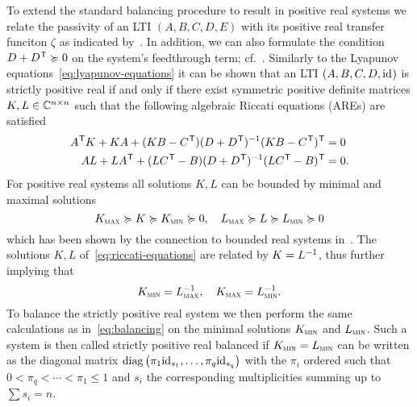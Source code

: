 To extend the standard balancing procedure to result in positive real systems we relate the passivity of an \ac{LTI} $(A, B, C, D, E)$ with its positive real transfer funciton $\zeta$ as indicated by~\cite[Corollary~2.7]{CGH2022}.
In addition, we can also formulate the condition $D + D\trans \succcurlyeq 0$ on the system's feedthrough term; cf.~\cite[Definition~5]{Gugercin2007}.
Similarly to the Lyapunov equations~\eqref{eq:lyapunov-equations} it can be shown that an \ac{LTI} $(A, B, C, D, \id)$ is strictly positive real if and only if there exist symmetric positive definite matrices $K, L \in \bb{C}^{n \times n}$ such that the following algebraic Riccati equations (AREs) are satisfied
\begin{equation}\label{eq:riccati-equations}
    \begin{aligned}
        A\trans K + K A + (K B - C\trans) (D + D\trans)\inv (K B - C\trans)\trans &= 0 \\
        A L + L A\trans + (L C\trans - B) (D + D\trans)\inv (L C\trans - B)\trans &= 0.
    \end{aligned}
\end{equation}
For positive real systems all solutions $K, L$ can be bounded by minimal and maximal solutions
\begin{equation*}
    K_{\msc{max}} \succcurlyeq K \succcurlyeq K_{\msc{min}} \succcurlyeq 0,\quad L_{\msc{max}} \succcurlyeq L \succcurlyeq L_{\msc{min}} \succcurlyeq 0
\end{equation*}
which has been shown by the connection to bounded real systems in~\cite[Proposition~5.1]{Ober1991}.
The solutions $K, L$ of~\eqref{eq:riccati-equations} are related by $K = L\inv$, thus further implying that
\begin{equation*}
    K_{\msc{min}} = L_{\msc{max}}\inv,\quad K_{\msc{max}} = L_{\msc{min}}\inv.
\end{equation*}
To balance the strictly positive real system we then perform the same calculations as in~\eqref{eq:balancing} on the minimal solutions $K_{\msc{min}}$ and $L_{\msc{min}}$.
Such a system is then called strictly positive real balanced if $K_{\msc{min}} = L_{\msc{min}}$ can be written as the diagonal matrix $\diag{\pi_1 \id[s_1], \dots, \pi_q \id[s_q]}$ with the $\pi_i$ ordered such that $0 < \pi_q < \cdots < \pi_1 \leq 1$ and $s_i$ the corresponding multiplicities summing up to $\sum s_i = n$.


